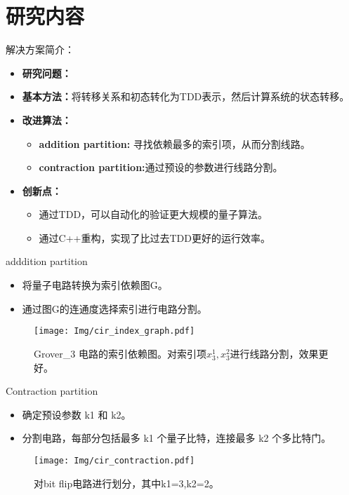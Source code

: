 \documentclass[aspectratio=1610]{ctexbeamer}
\begin{document}
\section{研究内容}
\begin{frame}{解决方案简介：}
    \begin{itemize}
        \item \textbf{研究问题：}
        \item \textbf{基本方法：}将转移关系和初态转化为TDD表示，然后计算系统的状态转移。
        \item \textbf{改进算法：}
        \begin{itemize}
            \item \textbf{addition partition:} 寻找依赖最多的索引项，从而分割线路。
            \item \textbf{contraction partition:}通过预设的参数进行线路分割。
        \end{itemize}
        \item \textbf{创新点：}
        \begin{itemize}
            \item 通过TDD，可以自动化的验证更大规模的量子算法。
            \item 通过C++重构，实现了比过去TDD更好的运行效率。
        \end{itemize}
    \end{itemize}
\end{frame}

\begin{frame}{adddition partition}
    \begin{itemize}
        \item 将量子电路转换为索引依赖图G。
        \item 通过图G的连通度选择索引进行电路分割。
    \end{itemize}
    \begin{figure}
        \centering
        \texttt{[image: Img/cir\_index\_graph.pdf]}
        \caption{Grover\_3 电路的索引依赖图。对索引项$x_3^1,x_3^2$进行线路分割，效果更好。}
    \end{figure}
\end{frame}
\begin{frame}{Contraction partition}
    \begin{itemize}
        \item 确定预设参数 k1 和 k2。
        \item 分割电路，每部分包括最多 k1 个量子比特，连接最多 k2 个多比特门。
    \end{itemize}
    \begin{figure}
        \centering
        \texttt{[image: Img/cir\_contraction.pdf]}
        \caption{对bit flip电路进行划分，其中k1=3,k2=2。}
    \end{figure}
\end{frame}
\end{document}
